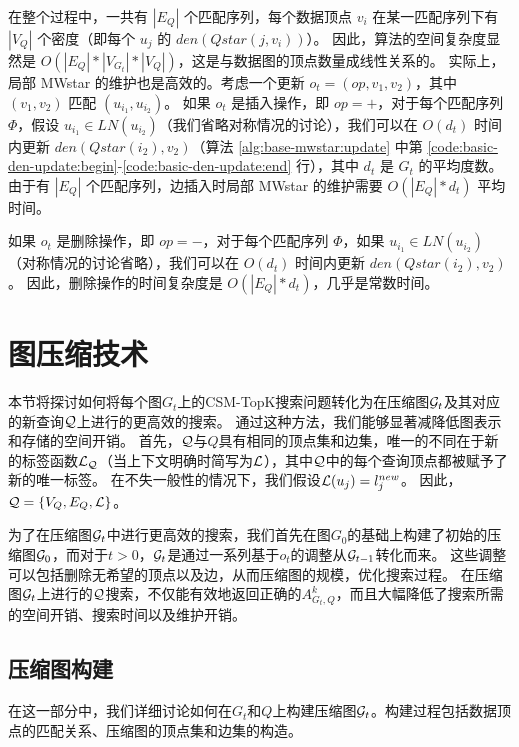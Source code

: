 在整个过程中，一共有 $|E_Q|$ 个匹配序列，每个数据顶点 $v_i$ 在某一匹配序列下有 $|V_Q|$ 个密度（即每个 $u_j$ 的 $den(Qstar(j, v_i))$）。
因此，算法的空间复杂度显然是 $O(|E_Q|*|V_{G_t}|*|V_Q|)$，这是与数据图的顶点数量成线性关系的。
实际上，局部 MWstar 的维护也是高效的。考虑一个更新 $o_t = (op, v_1, v_2)$，其中 $(v_1, v_2)$ 匹配 $(u_{i_1}, u_{i_2})$。
如果 $o_t$ 是插入操作，即 $op = +$，对于每个匹配序列 $\Phi$，假设 $u_{i_1} \in LN(u_{i_2})$（我们省略对称情况的讨论），我们可以在 $O(d_t)$ 时间内更新 $den(Qstar(i_2), v_2)$（算法 \ref{alg:base-mwstar:update} 中第 \ref{code:basic-den-update:begin}-\ref{code:basic-den-update:end} 行），其中 $d_t$ 是 $G_t$ 的平均度数。
由于有 $|E_Q|$ 个匹配序列，边插入时局部 MWstar 的维护需要 $O(|E_Q| * d_t)$ 平均时间。

如果 $o_t$ 是删除操作，即 $op = -$，对于每个匹配序列 $\Phi$，如果 $u_{i_1} \in LN(u_{i_2})$（对称情况的讨论省略），我们可以在 $O(d_t)$ 时间内更新 $den(Qstar(i_2), v_2)$。
因此，删除操作的时间复杂度是 $O(|E_Q| * d_t)$，几乎是常数时间。

\section{图压缩技术}
\label{mwstar:compact-graph}

本节将探讨如何将每个图$G_t$上的CSM-TopK搜索问题转化为在压缩图$\mathcal{G}_t$及其对应的新查询$\mathcal{Q}$上进行的更高效的搜索。
通过这种方法，我们能够显著减降低图表示和存储的空间开销。
首先，$\mathcal{Q}$与$Q$具有相同的顶点集和边集，唯一的不同在于新的标签函数$\mathcal{L}_{\mathcal{Q}}$（当上下文明确时简写为$\mathcal{L}$），其中$\mathcal{Q}$中的每个查询顶点都被赋予了新的唯一标签。
在不失一般性的情况下，我们假设$\mathcal{L}(u_j) = l_j^{new}$。
因此，$\mathcal{Q} = \{V_Q, E_Q, \mathcal{L}\}$。



为了在压缩图$\mathcal{G}_t$中进行更高效的搜索，我们首先在图$G_0$的基础上构建了初始的压缩图$\mathcal{G}_0$，而对于$t>0$，$\mathcal{G}_t$是通过一系列基于$o_t$的调整从$\mathcal{G}_{t-1}$转化而来。
这些调整可以包括删除无希望的顶点以及边，从而压缩图的规模，优化搜索过程。
在压缩图$\mathcal{G}_t$上进行的$\mathcal{Q}$搜索，不仅能有效地返回正确的$A_{G_t, Q}^k$，而且大幅降低了搜索所需的空间开销、搜索时间以及维护开销。

\subsection{压缩图构建}
\label{s-sec:compact-graph-construction}

在这一部分中，我们详细讨论如何在$G_t$和$Q$上构建压缩图$\mathcal{G}_t$。构建过程包括数据顶点的匹配关系、压缩图的顶点集和边集的构造。

